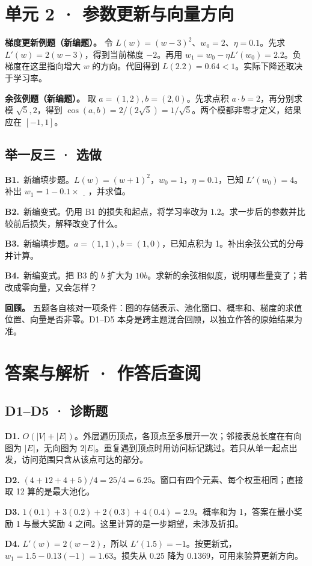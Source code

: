 \documentclass[UTF8,a4paper,11pt]{ctexart}
\newcommand{\CompactQuestion}[2]{\par\noindent\textbf{#1.}\ #2\par\vspace{.8em}}
\begin{document}
\section{单元 2 · 参数更新与向量方向}
\textbf{梯度更新例题（新编题）。} 令 $L(w)=(w-3)^2$、$w_0=2$、$\eta=0.1$。先求 $L'(w)=2(w-3)$，得到当前梯度 $-2$。再用 $w_1=w_0-\eta L'(w_0)=2.2$。负梯度在这里指向增大 $w$ 的方向。代回得到 $L(2.2)=0.64<1$。实际下降还取决于学习率。

\textbf{余弦例题（新编题）。} 取 $a=(1,2),b=(2,0)$。先求点积 $a\cdot b=2$，再分别求模 $\sqrt5,2$，得到 $\cos(a,b)=2/(2\sqrt5)=1/\sqrt5$。两个模都非零才定义，结果应在 $[-1,1]$。

\subsection{举一反三 · 选做}
\CompactQuestion{B1}{新编填步题。$L(w)=(w+1)^2$，$w_0=1$，$\eta=0.1$，已知 $L'(w_0)=4$。补出 $w_1=1-0.1\times\underline{\quad}$，并求值。}
\CompactQuestion{B2}{新编变式。仍用 B1 的损失和起点，将学习率改为 $1.2$。求一步后的参数并比较前后损失，解释改变了什么。}
\CompactQuestion{B3}{新编填步题。$a=(1,1),b=(1,0)$，已知点积为 1。补出余弦公式的分母并计算。}
\CompactQuestion{B4}{新编变式。把 B3 的 $b$ 扩大为 $10b$。求新的余弦相似度，说明哪些量变了；若改成零向量，又会怎样？}
\textbf{回顾。} 五题各自核对一项条件：图的存储表示、池化窗口、概率和、梯度的求值位置、向量是否非零。D1–D5 本身是跨主题混合回顾，以独立作答的原始结果为准。

\clearpage
\section{答案与解析 · 作答后查阅}
\subsection{D1–D5 · 诊断题}
\textbf{D1.} $O(|V|+|E|)$。外层遍历顶点，各顶点至多展开一次；邻接表总长度在有向图为 $|E|$，无向图为 $2|E|$。重复遇到顶点时用访问标记跳过。若只从单一起点出发，访问范围只含从该点可达的部分。

\textbf{D2.} $(4+12+4+5)/4=25/4=6.25$。窗口有四个元素、每个权重相同；直接取 12 算的是最大池化。

\textbf{D3.} $1(0.1)+3(0.2)+2(0.3)+4(0.4)=2.9$。概率和为 1，答案在最小奖励 1 与最大奖励 4 之间。这里计算的是一步期望，未涉及折扣。

\textbf{D4.} $L'(w)=2(w-2)$，所以 $L'(1.5)=-1$。按更新式，$w_1=1.5-0.13(-1)=1.63$。损失从 $0.25$ 降为 $0.1369$，可用来验算更新方向。
\end{document}
